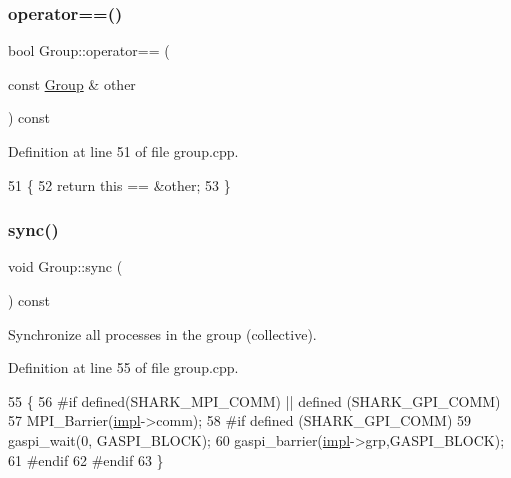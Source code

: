 \hypertarget{classshark_1_1_group_ae51d304a99a430333c2b910f55757c60}{}\label{classshark_1_1_group_ae51d304a99a430333c2b910f55757c60} 
\subsubsection{\texorpdfstring{operator==()}{operator==()}}
{\footnotesize\ttfamily bool Group\+::operator== (\begin{DoxyParamCaption}\item[{const \hyperlink{classshark_1_1_group}{Group} \&}]{other }\end{DoxyParamCaption}) const}



Definition at line 51 of file group.\+cpp.


\begin{DoxyCode}
51                                                \{
52     \textcolor{keywordflow}{return} \textcolor{keyword}{this} == &other;
53 \}
\end{DoxyCode}
\hypertarget{classshark_1_1_group_a73a616469f03e775f8203e86690fbe7e}{}\label{classshark_1_1_group_a73a616469f03e775f8203e86690fbe7e} 
\subsubsection{\texorpdfstring{sync()}{sync()}}
{\footnotesize\ttfamily void Group\+::sync (\begin{DoxyParamCaption}{ }\end{DoxyParamCaption}) const}

Synchronize all processes in the group (collective). 

Definition at line 55 of file group.\+cpp.


\begin{DoxyCode}
55                        \{
56 \textcolor{preprocessor}{#if defined(SHARK\_MPI\_COMM) || defined (SHARK\_GPI\_COMM)}
57     MPI\_Barrier(\hyperlink{classshark_1_1_group_a1b1f4345bb3d08df22d32c13bd693580}{impl}->comm);
58 \textcolor{preprocessor}{#if  defined (SHARK\_GPI\_COMM)}
59         gaspi\_wait(0, GASPI\_BLOCK);
60         gaspi\_barrier(\hyperlink{classshark_1_1_group_a1b1f4345bb3d08df22d32c13bd693580}{impl}->grp,GASPI\_BLOCK);
61 \textcolor{preprocessor}{#endif}
62 \textcolor{preprocessor}{#endif}
63 \}
\end{DoxyCode}


